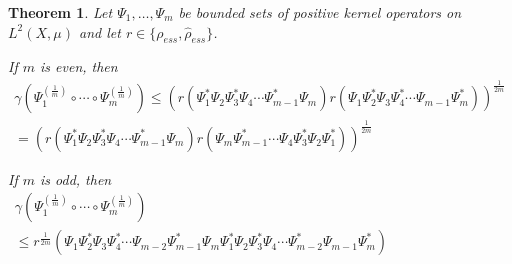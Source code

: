 \documentclass[12pt, reqno]{amsart}
\newtheorem{theorem}{Theorem}[section]
\theoremstyle{definition}
\theoremstyle{remark}
\numberwithin{equation}{section}
\begin{document}
\begin{theorem}
\label{first_ess}
Let $\Psi_1, \ldots ,\Psi_m$ be bounded sets of positive kernel operators on $L^2(X, \mu)$  and let  $r \in\{\rho _{ess},\hat{\rho} _{ess}\}$.

If $m$ is even, then
\begin{align}
\nonumber
\gamma (\Psi_1^{(\frac{1}{m})}\circ\cdots\circ\Psi_m^{(\frac{1}{m})}) \le (r(\Psi_1^*\Psi_2\Psi_3^*\Psi_4\cdots\Psi_{m-1}^*\Psi_m)r(\Psi_1\Psi_2^*\Psi_3\Psi_4^*\cdots\Psi_{m-1}\Psi_m^*))^{\frac{1}{2m}}\\
=(r(\Psi_1^*\Psi_2\Psi_3^*\Psi_4\cdots\Psi_{m-1}^*\Psi_m)r(\Psi_m\Psi_{m-1}^*\cdots\Psi_4\Psi_3^*\Psi_2\Psi_1^*))^{\frac{1}{2m}}\;\;\;\;\;\;\;\;\;\;\;\;\;\;\;\;\;\;\;\;\;\;\;\;\;\;\;\;\;\;\;
\label{ess_ineq1}
\end{align}

If $m$ is odd, then
\begin{align}
\nonumber
\gamma (\Psi_1^{(\frac{1}{m})}\circ\cdots\circ\Psi_m^{(\frac{1}{m})})\;\;\;\;\;\;\;\;\;\;\;\;\;\;\;\;\;\;\;\;\;\;\;\;\;\;\;\;\;\;\;\;\;\;\;\;\;\;\;\;\;\;\;\;\;\;\;\;\;\;\;\;\;\;\;\;\;\;\;\;\;\;\;\;\;\;\;\;\;\;\;\;\;\;\;\;\;\;\;\;\;\;\;\;\;\;\;\;\;\;\;\; \\
\le r^{\frac{1}{2m}}(\Psi_1\Psi_2^*\Psi_3\Psi_4^*\cdots\Psi_{m-2}\Psi_{m-1}^*\Psi_m\Psi_1^*\Psi_2\Psi_3^*\Psi_4\cdots\Psi_{m-2}^*\Psi_{m-1}\Psi_m^*)\;\;\;\;\;\;\;\;\;\;\;\;\;\;\;\;\;\;\;\;\;
\label{ess_ineq2}
\end{align}
\end{theorem}
\end{document}
